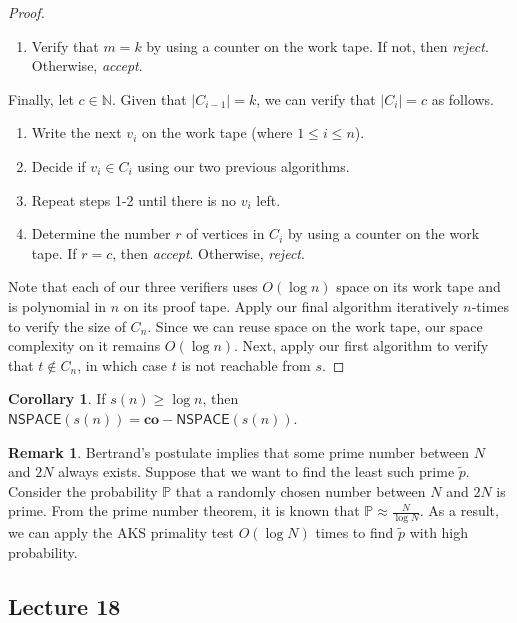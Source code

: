\documentclass[10pt,letterpaper,cm]{nupset}
\theoremstyle{definition}
\newtheorem{remark}{Remark}
\newtheorem{corollary}{Corollary}
\newcommand{\N}{\mathbb N}
\newcommand{\1}{\mathbf{1}}
\newcommand{\0}{\vec 0}
\begin{document}
\begin{proof}
\begin{enumerate}
\item Verify that $m = k$ by using a counter on the work tape. If not, then \textit{reject}. Otherwise, \textit{accept}.
\end{enumerate}
Finally, let $c\in \N$. Given that $|C_{i-1}|=k$, we can verify that $|C_i| = c$ as follows. 
\begin{enumerate} 
\item Write the next $v_i$ on the work tape (where $1\leq i \leq n$). 
\item Decide if $v_i \in C_i$ using our two previous algorithms.
\item Repeat steps 1-2 until there is no $v_i$ left.
\item Determine the number $r$ of vertices in $C_i$ by using a counter on the work tape. If $r = c$, then \textit{accept}. Otherwise, \textit{reject}.
\end{enumerate}
Note that each of our three verifiers uses $O(\log{n})$ space on its work tape and  is polynomial in $n$ on its proof tape. Apply our final algorithm iteratively $n$-times to verify the size of  $C_n$. Since we can reuse space on the work tape, our space complexity on it remains $O(\log{n})$.  Next, apply our first algorithm to verify that $t\notin C_n$, in which case $t$ is not reachable from $s$.
\end{proof}

\begin{corollary}
If $s(n) \geq \log{n}$, then $\mathsf{NSPACE}(s(n)) = \mathbf{co}{-}\mathsf{NSPACE}(s(n))$.
\end{corollary}

\begin{remark}
Bertrand's postulate implies that some prime number between $N$ and $2N$ always exists.  Suppose that we want to find the least such prime $\tilde{p}$. Consider the probability $\mathbb{P}$ that a randomly chosen number between $N$ and $2N$ is prime. From the prime number theorem, it is known that $\mathbb{P} \approx \frac{N}{\log{N}}$. As a result, we can apply the AKS primality test $O(\log{N})$ times to find $\tilde{p}$ with high probability.
\end{remark}

\subsection{Lecture 18}
\end{document}

